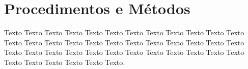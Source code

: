 \chapter{Procedimentos e Métodos}
\paragrafo{}
Texto Texto Texto Texto Texto Texto Texto Texto Texto Texto Texto Texto Texto Texto Texto Texto Texto Texto Texto Texto Texto Texto Texto Texto Texto Texto Texto Texto Texto Texto Texto Texto Texto Texto Texto Texto Texto Texto Texto Texto Texto Texto.



